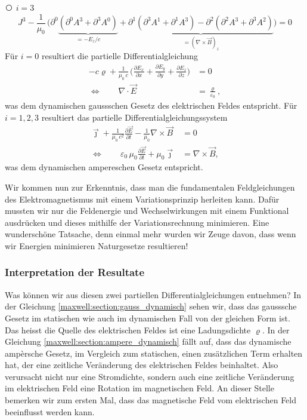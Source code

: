 {\larger\textcircled{}} $i = 3$
\[
J^3  -\frac{1}{\mu_0}\,\biggl(\partial^0\underbrace{\left(\partial^0 A^3 + \partial^3 A^0\right)}_{\displaystyle=-E_z/c}
+ \underbrace{\partial^1\left(\partial^3 A^1 + \partial^1 A^3\right)
	- \partial^2\left(\partial^2 A^3 + \partial^3 A^2\right)}_{\displaystyle=(\nabla\times\vec{B})_z}\biggr)
=
0
\]
Für $i=0$ resultiert die partielle Differentialgleichung
\begin{align}
-c\varrho + \frac{1}{\mu_0\,c}\,\biggl(\frac{\partial E_x}{\partial x}
+ \frac{\partial E_y}{\partial y} + \frac{\partial E_z}{\partial z}\biggr)
&=
0\\[1em]
\Leftrightarrow \qquad \nabla\cdot\vec{E}
&=
\frac{\varrho}{\varepsilon_0},
\label{maxwell:section:gauss_dynamisch}
\end{align}
was dem dynamischen gaussschen Gesetz des elektrischen Feldes entspricht.
Für $i=1,2,3$ resultiert das partielle Differentialgleichungssystem
\begin{align}
\vec{\jmath} + \frac{1}{\mu_0\,c^2}\frac{\partial \vec{E}}{\partial t}
- \frac{1}{\mu_0}\nabla\times\vec{B}
&=
0\\[1em]
\Leftrightarrow \qquad \varepsilon_0\,\mu_0\frac{\partial \vec{E}}{\partial t} + \mu_0\vec{\jmath}
&=
\nabla\times\vec{B},
\label{maxwell:section:ampere_dynamisch}
\end{align}
was dem dynamischen ampereschen Gesetz entspricht.
 
Wir kommen nun zur Erkenntnis, dass man die fundamentalen Feldgleichungen des Elektromagnetismus mit einem Variationsprinzip herleiten kann.
Dafür mussten wir nur die Feldenergie und Wechselwirkungen mit einem Funktional ausdrücken und dieses mithilfe der Variationsrechnung minimieren.
Eine wunderschöne Tatsache, denn einmal mehr wurden wir Zeuge davon, dass wenn wir Energien minimieren Naturgesetze resultieren!

\subsubsection{Interpretation der Resultate}
Was können wir aus diesen zwei partiellen Differentialgleichungen entnehmen?
In der Gleichung \eqref{maxwell:section:gauss_dynamisch} sehen wir, dass das gausssche Gesetz im statischen wie auch im dynamischen Fall von der gleichen Form ist.
Das heisst die Quelle des elektrischen Feldes ist eine Ladungsdichte $\varrho$.
In der Gleichung \eqref{maxwell:section:ampere_dynamisch} fällt auf, dass das dynamische ampèrsche Gesetz, im Vergleich zum statischen, einen zusätzlichen Term erhalten hat, der eine zeitliche Veränderung des elektrischen Feldes beinhaltet.
Also verursacht nicht nur eine Stromdichte, sondern auch eine zeitliche Veränderung im elektrischen Feld eine Rotation im magnetischen Feld.
An dieser Stelle bemerken wir zum ersten Mal, dass das magnetische Feld vom elektrischen Feld beeinflusst werden kann.


